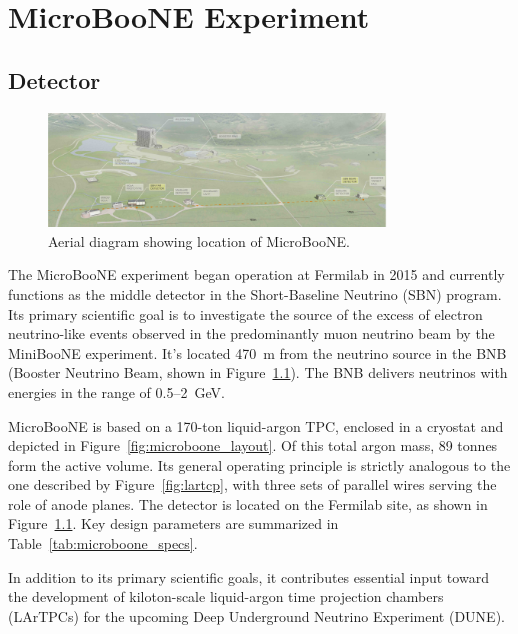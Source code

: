 \documentclass{pracalicmgr}
\begin{document}
\chapter{MicroBooNE Experiment}

\section{Detector}

\begin{figure}[H]
    \centering
    \includegraphics[width=0.80\textwidth]{src/microbooneBirdseyes.pdf}
    \caption{Aerial diagram showing location of MicroBooNE.\cite{MicroBooNEDesign}}
    \label{fig:microboone_birdseye}
\end{figure}

The MicroBooNE experiment began operation at Fermilab in 2015 and currently functions as the middle detector in the Short-Baseline Neutrino (SBN) program. Its primary scientific goal is to investigate the source of the excess of electron neutrino-like events observed in the predominantly muon neutrino beam by the MiniBooNE experiment. It's located 470~m from the neutrino source in the BNB (Booster Neutrino Beam, shown in Figure~\ref{fig:microboone_birdseye}). The BNB delivers neutrinos with energies in the range of 0.5–2~GeV.

MicroBooNE is based on a 170-ton liquid-argon TPC, enclosed in a cryostat and depicted in Figure~\ref{fig:microboone_layout}. Of this total argon mass, 89 tonnes form the active volume. Its general operating principle is strictly analogous to the one described by Figure~\ref{fig:lartcp}, with three sets of parallel wires serving the role of anode planes. The detector is located on the Fermilab site, as shown in Figure~\ref{fig:microboone_birdseye}. Key design parameters are summarized in Table~\ref{tab:microboone_specs}\cite{MicroBooNEDesign}.

In addition to its primary scientific goals, it contributes essential input toward the development of kiloton-scale liquid-argon time projection chambers (LArTPCs) for the upcoming Deep Underground Neutrino Experiment (DUNE).
\end{document}
